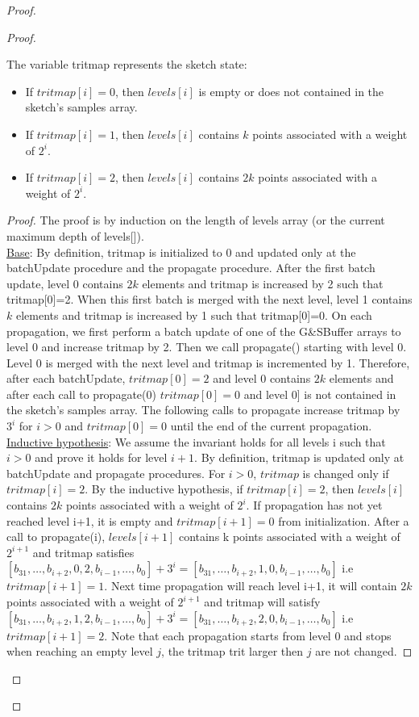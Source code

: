 \begin{proof}
\begin{proof}
\begin{invariant} \label{Inv: tritmap_sketch_state}
The variable tritmap represents the sketch state:
\begin{itemize}
    \item If \(tritmap[i] = 0\), then \(levels[i]\) is empty or does not contained in the sketch's samples array.
    \item If \(tritmap[i] = 1\), then \(levels[i]\) contains \(k\) points associated with a weight of \(2^i\).
    \item If \(tritmap[i] = 2\), then \(levels[i]\) contains \(2k\) points associated with a weight of \(2^i\).
\end{itemize}
\end{invariant}
\begin{proof}
The proof is by induction on the length of levels array (or the current maximum depth of levels[]).\\
\underline{Base}: By definition, tritmap is initialized to 0 and updated only at the batchUpdate procedure and the propagate procedure.
After the first batch update, level 0 contains $2k$ elements and tritmap is increased by 2 such that tritmap[0]=2. When this first batch is merged with the next level, level 1 contains $k$ elements and tritmap is increased by 1 such that tritmap[0]=0.
On each propagation, we first perform a batch update of one of the G\&SBuffer arrays to level 0 and increase tritmap by 2. Then we call propagate() starting with level 0. Level 0 is merged with the next level and tritmap is incremented by 1. Therefore, after each batchUpdate, \(tritmap[0] = 2\) and level 0 contains \(2k\) elements and after each call to propagate(0) \(tritmap[0] = 0\) and level 0] is not contained in the sketch's samples array. The following calls to propagate increase tritmap by $3^i$ for $i>0$ and \(tritmap[0] = 0\) until the end of the current propagation. \\
\underline{Inductive hypothesis}: We assume the invariant holds for all levels i such that \(i>0\) and prove it holds for level \(i+1\). By definition, tritmap is updated only at batchUpdate and propagate procedures. For \(i>0\), \(tritmap\) is changed only if \(tritmap[i]=2\). By the inductive hypothesis, if \(tritmap[i] = 2\), then \(levels[i]\) contains \(2k\) points associated with a weight of \(2^i\). If propagation has not yet reached level i+1, it is empty and \(tritmap[i+1]=0\) from initialization. After a call to propagate(i), \(levels[i+1]\) contains k points associated with a weight of \(2^{i+1}\) and tritmap satisfies \([b_{31},\dots,b_{i+2},0,2,b_{i-1},\dots,b_0] + 3^i = [b_{31},\dots,b_{i+2},1,0,b_{i-1},\dots,b_0]\) i.e \(tritmap[i+1]=1\). Next time propagation will reach level i+1, it will contain \(2k\) points associated with a weight of \(2^{i+1}\) and tritmap will satisfy \([b_{31},\dots,b_{i+2},1,2,b_{i-1},\dots,b_0] + 3^i = [b_{31},\dots,b_{i+2},2,0,b_{i-1},\dots,b_0]\) i.e \(tritmap[i+1]=2\). Note that each propagation starts from level 0 and stops when reaching an empty level $j$, the tritmap trit larger then $j$ are not changed.
\end{proof}



\end{proof}
\end{proof}
